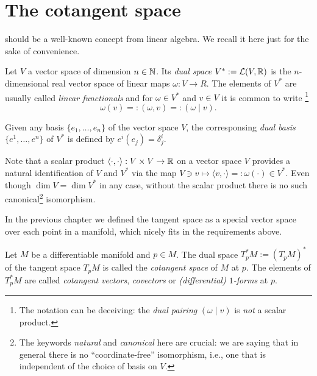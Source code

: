 \section{The cotangent space}

 should be a well-known concept from linear algebra. We recall it here just for the sake of convenience.

\begin{definition}
	Let $V$ a vector space of dimension $n\in \mathbb{N}$.
	Its \emph{dual space} $V^* := \mathcal{L}(V, \mathbb{R})$ is the $n$-dimensional real vector space of linear maps $\omega:V \to R$.
	The elements of $V^*$ are usually called \emph{linear functionals} and for $\omega\in V^*$ and $v\in V$ it is common to write
	\footnote{The notation can be deceiving: the \emph{dual pairing} $(\omega \mid v)$ is \emph{not} a scalar product.}
	\begin{equation}
		\omega(v) =: (\omega, v) =: (\omega \mid v).
	\end{equation}

	Given any basis $\{e_1, \ldots, e_n\}$ of the vector space $V$, the corresponsing \emph{dual basis} $\{e^1, \ldots, e^n\}$ of $V^*$ is defined by $e^i(e_j) = \delta^i_j$.
\end{definition}

\begin{remark}\label{rmk:identification}
	Note that a scalar product $\langle\cdot, \cdot\rangle :  V\times V \to \mathbb{R}$ on a vector space $V$ provides a natural identification of $V$ and $V^*$ via the map $V\ni v \mapsto \langle v, \cdot \rangle =: \omega(\cdot) \in V^*$.
	Even though $\dim V = \dim V^*$ in any case, without the scalar product there is no such canonical\footnote{The keywords \emph{natural} and \emph{canonical} here are crucial: we are saying that in general there is no ``coordinate-free'' isomorphism, i.e., one that is independent of the choice of basis on $V$.} isomorphism.
\end{remark}

In the previous chapter we defined the tangent space as a special vector space over each point in a manifold, which nicely fits in the requirements above.

\begin{definition}
	Let $M$ be a differentiable manifold and $p\in M$.
	The dual space $T_p^*M := (T_pM)^*$ of the tangent space $T_pM$ is called the \emph{cotangent space} of $M$ at $p$.
	The elements of $T^*_pM$ are called \emph{cotangent vectors}, \emph{covectors} or \emph{(differential) $1$-forms} at $p$.
\end{definition}

